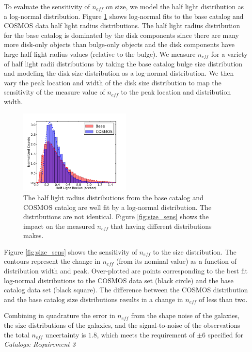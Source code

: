 \documentclass[11pt]{article}
\begin{document}
To evaluate the sensitivity of $n_{eff}$ on size, we model the 
half light distribution as a log-normal distribution.  Figure
\ref{fig:ln_fit} shows log-normal fits to the base catalog and COSMOS
data half light radius distributions.  The half light radius
distribution for the base catalog is dominated by the disk components
since there are many more disk-only objects than bulge-only objects
and the disk components have large half light radius values (relative
to the bulge). We measure $n_{eff}$ for a variety of half light radii
distributions by taking the base catalog bulge size distribution and
modeling the disk size distribution as a log-normal distribution.  We
then vary the peak location and width of the disk size distribution
to map the sensitivity of the measure value of $n_{eff}$ to the peak
location and distribution width.
\begin{figure}[h]
\centering
\includegraphics[width=0.5\textwidth]{validation_figures/ln_fit.png}
\caption{The half light radius distributions from the base catalog and 
COSMOS catalog are well fit by a log-normal distribution.  The distributions
are not identical.  Figure \ref{fig:size_sens} shows the impact on the  
measured $n_{eff}$ that having different distributions makes.
    \label{fig:ln_fit}}
\end{figure}

Figure \ref{fig:size_sens} shows the sensitivity of $n_{eff}$ to the
size distribution.  The contours represent the change in $n_{eff}$
(from its nominal value) as a function of distribution width and
peak. Over-plotted are points corresponding to the best fit log-normal
distributions to the COSMOS data set (black circle) and the base
catalog data set (black square).  The difference between the COSMOS
distribution and the base catalog size distributions results in a
change in $n_{eff}$ of less than two.

Combining in quadrature the error in $n_{eff}$ from the shape noise of
the galaxies, the size distributions of the galaxies, and the
signal-to-noise of the observations the total $n_{eff}$ uncertainty is
$1.8$, which meets the requirement of $\pm6$ specified for {\it
  Catalogs: Requirement 3}
\end{document}
